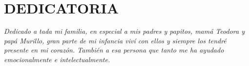 \chapter*{\hfill DEDICATORIA}
\thispagestyle{empty}
\doublespacing
\begin{flushright}
\textit{Dedicado a tada mi familia, en especial a mis padres y papitos, mamá Teodora y papá Murillo, gran parte de mi infancia viví con ellos y siempre los tendré presente en mi corazón. También a esa persona que tanto me ha ayudado emocionalmente e intelectualmente.}
\end{flushright}

